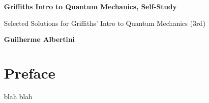 \documentclass[titlepage]{book}
\begin{document}
\begin{titlepage}
    \begin{center}
        \vspace*{1cm}
            
        \Huge
        \textbf{Griffiths Intro to Quantum Mechanics, Self-Study}
            
        \vspace{0.5cm}
        \LARGE
        Selected Solutions for Griffiths' Intro to Quantum Mechanics (3rd)
            
        \vspace{1.5cm}
            
        \textbf{Guilherme Albertini}
            
        \vfill
            
            
        \vspace{0.8cm}
            

        \Large
        
            
    \end{center}
\end{titlepage}

\frontmatter
\tableofcontents

\chapter*{Preface}

\TODO blah blah

\mainmatter


\end{document}
